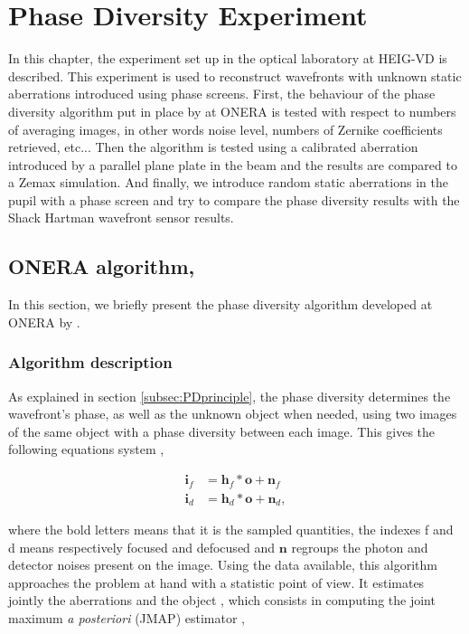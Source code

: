 
\chapter{Phase Diversity Experiment} 
\label{ch:PDExp}

In this chapter, the experiment set up in the optical laboratory at HEIG-VD is described. This experiment is used to reconstruct wavefronts with unknown static aberrations introduced using phase screens. First, the behaviour of the phase diversity algorithm put in place by \citet{mugnier_2006} at ONERA is tested with respect to numbers of averaging images, in other words noise level, numbers of Zernike coefficients retrieved, etc... Then the algorithm is tested using a calibrated aberration introduced by a parallel plane plate in the beam and the results are compared to a Zemax simulation. And finally, we introduce random static aberrations in the pupil with a phase screen and try to compare the phase diversity results with the Shack Hartman wavefront sensor results.

\section[ONERA algorithm]{ONERA algorithm, \citet{mugnier_2006}}
\label{sec:ONERAalgo}

In this section, we briefly present the phase diversity algorithm developed at ONERA by \citet{mugnier_2006}.

\subsection{Algorithm description}
\label{subsec:OneraAlgoDesc}

As explained in section \ref{subsec:PDprinciple}, the phase diversity determines the wavefront's phase, as well as the unknown object when needed, using two images of the same object with a phase diversity between each image. This gives the following equations system \citep[p.11]{mugnier_2006},

\begin{align}
\mathbf{i}_f &= \mathbf{h}_f \ast \mathbf{o} + \mathbf{n}_f \\
\mathbf{i}_d &= \mathbf{h}_d \ast \mathbf{o} + \mathbf{n}_d,
\label{eqt:systemEQT}
\end{align}

where the bold letters means that it is the sampled quantities, the indexes f and d means respectively focused and defocused and $\mathbf{n}$ regroups the photon and detector noises present on the image. Using the data available, this algorithm approaches the problem at hand with a statistic point of view. It estimates jointly the aberrations and the object \citep{Paxman1992}, which consists in computing the joint maximum \textit{a posteriori} (JMAP) estimator \citep[p.17]{mugnier_2006},

